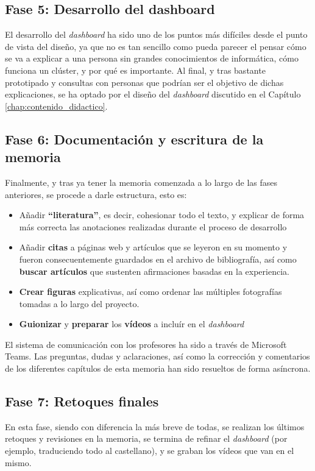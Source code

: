 \subsection{Fase 5: Desarrollo del dashboard}
El desarrollo del \textit{dashboard} ha sido uno de los puntos más difíciles desde el punto de vista del diseño, ya que no es tan sencillo como pueda parecer el pensar cómo se va a explicar a una persona sin grandes conocimientos de informática, cómo funciona un clúster, y por qué es importante. Al final, y tras bastante prototipado y consultas con personas que podrían ser el objetivo de dichas explicaciones, se ha optado por el diseño del \textit{dashboard} discutido en el Capítulo \ref{chap:contenido_didactico}.

\subsection{Fase 6: Documentación y escritura de la memoria}
Finalmente, y tras ya tener la memoria comenzada a lo largo de las fases anteriores, se procede a darle estructura, esto es:
\begin{itemize}
    \item Añadir \textbf{``literatura''}, es decir, cohesionar todo el texto, y explicar de forma más correcta las anotaciones realizadas durante el proceso de desarrollo
    \item Añadir \textbf{citas} a páginas web y artículos que se leyeron en su momento y fueron consecuentemente guardados en el archivo de bibliografía, así como \textbf{buscar artículos} que sustenten afirmaciones basadas en la experiencia.
    \item \textbf{Crear figuras} explicativas, así como ordenar las múltiples fotografías tomadas a lo largo del proyecto.
    \item \textbf{Guionizar} y \textbf{preparar} los \textbf{vídeos} a incluír en el \textit{dashboard}
\end{itemize}

El sistema de comunicación con los profesores ha sido a través de Microsoft Teams. Las preguntas, dudas y aclaraciones, así como la corrección y comentarios de los diferentes capítulos de esta memoria han sido resueltos de forma asíncrona.

\subsection{Fase 7: Retoques finales}
En esta fase, siendo con diferencia la más breve de todas, se realizan los últimos retoques y revisiones en la memoria, se termina de refinar el \textit{dashboard} (por ejemplo, traduciendo todo al castellano), y se graban los vídeos que van en el mismo.


